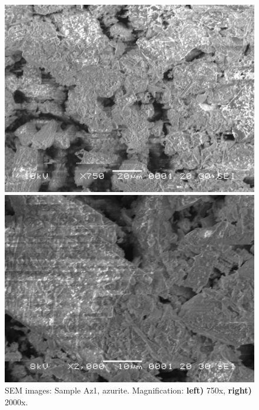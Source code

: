 \begin{figure}[H]
\centering
\begin{minipage}{.45\textwidth}
  \centering
  \includegraphics[width=\linewidth]{Az1_x750_3_220221}
\end{minipage}
\begin{minipage}{.45\textwidth}
  \centering
  \includegraphics[width=\linewidth]{Az1_x2000_4_220221}
\end{minipage}
\caption[SEM images: Sample Az1, azurite]{SEM images: Sample Az1, azurite. Magnification: \textbf{left)} 750x, \textbf{right)} 2000x.}
\label{fig:az1_sem_1}
\end{figure}



